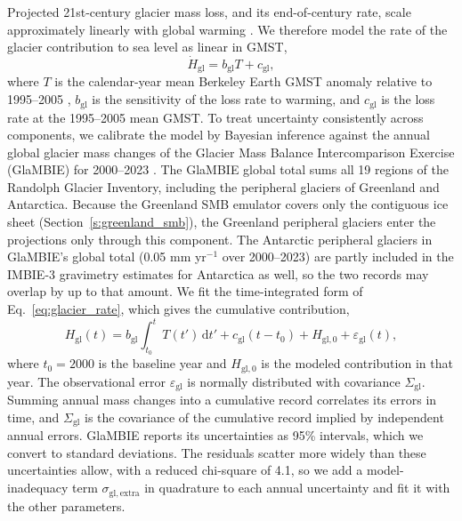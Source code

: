 \documentclass[draft,linenumbers]{agujournal2025}
\begin{document}
Projected 21st-century glacier mass loss, and its end-of-century rate, scale approximately linearly with global warming \citep{Rounce2023,Edwards2021}. We therefore model the rate of the glacier contribution to sea level as linear in GMST,
\begin{equation}
	\dot{H}_{\mathrm{gl}} = b_{\mathrm{gl}}T + c_{\mathrm{gl}},
	\label{eq:glacier_rate}
\end{equation}
where $T$ is the calendar-year mean Berkeley Earth GMST anomaly relative to 1995--2005 \citep{Rohde2020}, $b_{\mathrm{gl}}$ is the sensitivity of the loss rate to warming, and $c_{\mathrm{gl}}$ is the loss rate at the 1995--2005 mean GMST. To treat uncertainty consistently across components, we calibrate the model by Bayesian inference against the annual global glacier mass changes of the Glacier Mass Balance Intercomparison Exercise (GlaMBIE) for 2000--2023 \citep{GlaMBIE2025}. The GlaMBIE global total sums all 19 regions of the Randolph Glacier Inventory, including the peripheral glaciers of Greenland and Antarctica. Because the Greenland SMB emulator covers only the contiguous ice sheet (Section~\ref{s:greenland_smb}), the Greenland peripheral glaciers enter the projections only through this component. The Antarctic peripheral glaciers in GlaMBIE's global total (0.05 mm yr$^{-1}$ over 2000--2023) are partly included in the IMBIE-3 gravimetry estimates for Antarctica as well, so the two records may overlap by up to that amount. We fit the time-integrated form of Eq.~\ref{eq:glacier_rate}, which gives the cumulative contribution,
\begin{equation}
	H_{\mathrm{gl}}(t) = b_{\mathrm{gl}}\int_{t_0}^{t}T(t')\,\mathrm{d}t' + c_{\mathrm{gl}}(t - t_0) + H_{\mathrm{gl},0} + \varepsilon_{\mathrm{gl}}(t),
	\label{eq:glacier_level}
\end{equation}
where $t_0 = 2000$ is the baseline year and $H_{\mathrm{gl},0}$ is the modeled contribution in that year. The observational error $\varepsilon_{\mathrm{gl}}$ is normally distributed with covariance $\Sigma_{\mathrm{gl}}$. Summing annual mass changes into a cumulative record correlates its errors in time, and $\Sigma_{\mathrm{gl}}$ is the covariance of the cumulative record implied by independent annual errors. GlaMBIE reports its uncertainties as 95\% intervals, which we convert to standard deviations. The residuals scatter more widely than these uncertainties allow, with a reduced chi-square of 4.1, so we add a model-inadequacy term $\sigma_{\mathrm{gl,extra}}$ in quadrature to each annual uncertainty and fit it with the other parameters.
\end{document}
